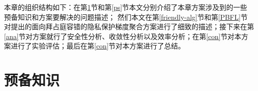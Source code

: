 本章的组织结构如下：在第\ref{bg}节和第\ref{ps}节本文分别介绍了本章方案涉及到的一些预备知识和方案要解决的问题描述；
然们本文在第\ref{friendly-alg}节和第\ref{PBFL}节对提出的面向拜占庭容错的隐私保护梯度聚合方案进行了细致的描述；接下来在第\ref{ana}节对方案就行了安全性分析、收敛性分析以及效率分析；在第\ref{con}节对本方案进行了实验评估；最后在第\ref{con}节对本方案进行了总结。

\section{预备知识}\label{bg}

%

